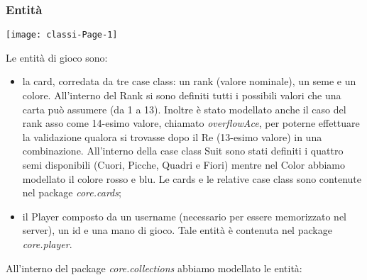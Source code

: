 \subsubsection{Entità}
\begin{center}
    \texttt{[image: classi-Page-1]}
\end{center}
Le entità di gioco sono:
\begin{itemize}
    \item la card, corredata da tre case class: un rank (valore nominale), un seme e un colore.
    All’interno del Rank si sono definiti tutti i possibili valori che una carta può assumere (da 1 a 13). Inoltre è stato modellato anche il caso del rank asso come 14-esimo valore, chiamato \textit{overflowAce}, per poterne effettuare la validazione qualora si trovasse dopo il Re (13-esimo valore) in una combinazione.
    All’interno della case class Suit sono stati definiti i quattro semi disponibili (Cuori, Picche, Quadri e Fiori) mentre nel Color abbiamo modellato il colore rosso e blu. Le cards e le relative case class sono contenute nel package \textit{core.cards};
    \item il Player composto da un username (necessario per essere memorizzato nel server), un id e  una mano di gioco. Tale entità è contenuta nel package \textit{core.player}.
\end{itemize}
All’interno del package \textit{core.collections} abbiamo modellato le entità:
